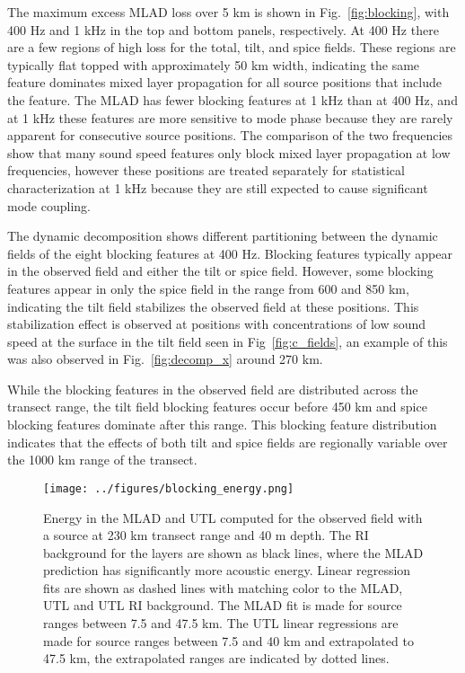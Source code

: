 \documentclass[preprint,NumberedRefs]{JASA}
\begin{document}
The maximum excess MLAD loss over 5 km is shown in Fig.~\ref{fig:blocking}, with 400 Hz and 1 kHz in the top and bottom panels, respectively. At 400 Hz there are a few regions of high loss for the total, tilt, and spice fields. These regions are typically flat topped with approximately 50 km width, indicating the same feature dominates mixed layer propagation for all source positions that include the feature. The MLAD has fewer blocking features at 1 kHz than at 400 Hz, and at 1 kHz these features are more sensitive to mode phase because they are rarely apparent for consecutive source positions. The comparison of the two frequencies show that many sound speed features only block mixed layer propagation at low frequencies, however these positions are treated separately for statistical characterization at 1 kHz because they are still expected to cause significant mode coupling.

The dynamic decomposition shows different partitioning between the dynamic fields of the eight blocking features at 400 Hz. Blocking features typically appear in the observed field and either the tilt or spice field. However, some blocking features appear in only the spice field in the range from 600 and 850 km, indicating the tilt field stabilizes the observed field at these positions. This stabilization effect is observed at positions with concentrations of low sound speed at the surface in the tilt field seen in Fig~\ref{fig:c_fields}, an example of this was also observed in Fig.~\ref{fig:decomp_x} around 270 km.

While the blocking features in the observed field are distributed across the transect range, the tilt field blocking features occur before 450 km and spice blocking features dominate after this range. This blocking feature distribution indicates that the effects of both tilt and spice fields are regionally variable over the 1000 km range of the transect.

\begin{figure}
\texttt{[image: ../figures/blocking\_energy.png]}
    \caption{Energy in the MLAD and UTL computed for the observed field with a source at 230 km transect range and 40 m depth. The RI background for the layers are shown as black lines, where the MLAD prediction has significantly more acoustic energy. Linear regression fits are shown as dashed lines with matching color to the MLAD, UTL and UTL RI background. The MLAD fit is made for source ranges between 7.5 and 47.5 km. The UTL linear regressions are made for source ranges between 7.5 and 40 km and extrapolated to 47.5 km, the extrapolated ranges are indicated by dotted lines.}
    \label{fig:ml_energy}
\end{figure}
\end{document}

